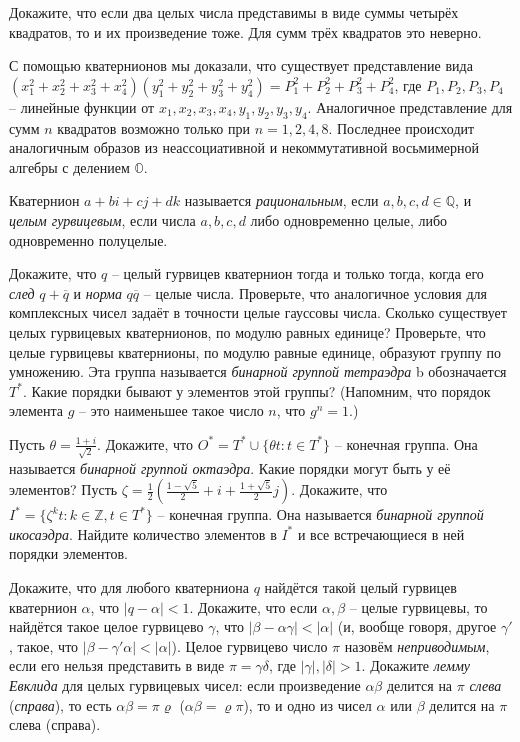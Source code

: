 \documentclass[a4paper, 12pt]{article}
\begin{document}
	 Докажите, что если два целых числа представимы в виде суммы четырёх квадратов, то и их произведение тоже.  Для сумм трёх квадратов это неверно.

\small{С помощью кватернионов мы доказали, что существует представление вида \\ $(x_1^2+x_2^2+x_3^2+x_4^2)(y_1^2+y_2^2+y_3^2+y_4^2) = P_1^2+P_2^2+P_3^2+P_4^2$, где $P_1,P_2,P_3,P_4$ -- линейные функции от $x_1,x_2,x_3,x_4,y_1,y_2,y_3,y_4$. Аналогичное представление для сумм $n$ квадратов возможно только при $n=1,2,4,8$. Последнее происходит аналогичным образов из неассоциативной и некоммутативной восьмимерной алгебры с делением $\mathbb{O}$}.

	Кватернион $a+bi+cj+dk$ называется \emph{рациональным}, если $a,b,c,d \in \mathbb{Q}$, и \emph{целым гурвицевым}, если числа $a,b,c,d$ либо одновременно целые, либо одновременно полуцелые.

	 Докажите, что $q$ -- целый гурвицев кватернион тогда и только тогда, когда его \emph{след} $q+\overline{q}$ и \emph{норма} $q\overline{q}$ -- целые числа.
	 Проверьте, что аналогичное условия для комплексных чисел задаёт в точности целые гауссовы числа.  Сколько существует целых гурвицевых кватернионов, по модулю равных единице?  Проверьте, что целые гурвицевы кватернионы, по модулю равные единице, образуют группу по умножению. Эта группа называется \emph{бинарной группой тетраэдра} b обозначается $T^*$. Какие порядки бывают у элементов этой группы? (Напомним, что порядок элемента $g$ -- это наименьшее такое число $n$, что $g^n=1$.)

	 Пусть $\theta = \frac{1+i}{\sqrt{2}}$. Докажите, что $O^* = T^* \cup  \{\theta t : t \in T^* \}$ -- конечная группа. Она называется \emph{бинарной группой октаэдра}. Какие порядки могут быть у её элементов?  Пусть $\zeta = \frac{1}{2}(\frac{1-\sqrt{5}}{2}+i+\frac{1+\sqrt{5}}{2}j)$. Докажите, что $I^* = \{\zeta^k t : k \in \mathbb{Z}, t \in T^* \}$ -- конечная группа. Она называется \emph{бинарной группой икосаэдра}. Найдите количество элементов в $I^*$ и все встречающиеся в ней порядки элементов.

	 Докажите, что для любого кватерниона $q$ найдётся такой целый гурвицев кватернион $\alpha$, что $|q-\alpha|<1$.  Докажите, что если $\alpha,\beta$ -- целые гурвицевы, то найдётся такое целое гурвицево $\gamma$, что $|\beta - \alpha \gamma| < |\alpha|$ (и, вообще говоря, другое $\gamma'$, такое, что $|\beta - \gamma' \alpha|< |\alpha|$).  Целое гурвицево число $\pi$ назовём \emph{неприводимым}, если его нельзя представить в виде $\pi = \gamma \delta$, где $|\gamma|, |\delta| > 1$. Докажите \emph{лемму Евклида} для целых гурвицевых чисел: если произведение $\alpha \beta$ делится на $\pi$ \emph{слева} (\emph{справа}), то есть $\alpha \beta = \pi \varrho$ ($\alpha \beta = \varrho \pi$), то и одно из чисел $\alpha$ или $\beta$ делится на $\pi$ слева (справа).
\end{document}
